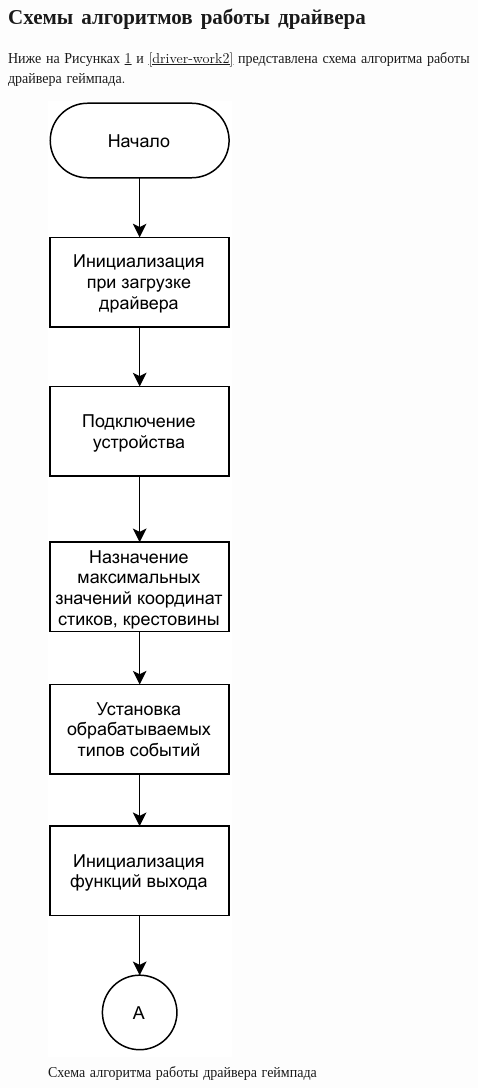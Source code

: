 \subsection{Схемы алгоритмов работы драйвера}
Ниже на Рисунках \ref{driver-work1} и \ref{driver-work2} представлена схема алгоритма работы драйвера геймпада.

\begin{figure}[h!]
	\centering
	\includegraphics[scale=1.5]{img/driver-work1.pdf}
	\caption{Схема алгоритма работы драйвера геймпада}
	\label{driver-work1}
\end{figure}
\newpage

